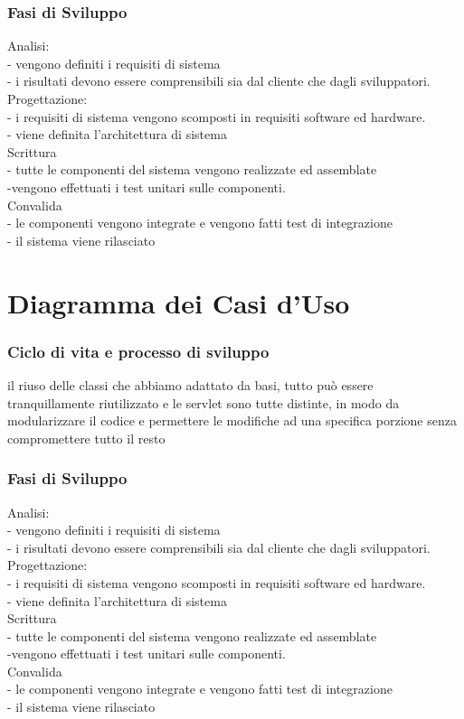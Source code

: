 \documentclass[a4paper,12pt]{beamer}
\begin{document}
\begin{frame}
\frametitle{Fasi di Sviluppo}
Analisi:\\
- vengono definiti i requisiti di sistema\\
- i risultati devono essere comprensibili sia dal cliente che dagli sviluppatori.\\
Progettazione:\\
- i requisiti di sistema vengono scomposti in requisiti software ed hardware.\\
- viene definita l’architettura di sistema\\
Scrittura \\
- tutte le componenti del sistema vengono realizzate ed assemblate  \\
-vengono effettuati i test unitari sulle componenti.\\
Convalida\\
- le componenti vengono integrate e vengono fatti test di integrazione\\
- il sistema viene rilasciato\\
\end{frame}

\pagebreak

\section{Diagramma dei Casi d'Uso}
\begin{frame}
\frametitle{Ciclo di vita e processo di sviluppo}
il riuso delle classi che abbiamo adattato da basi, tutto può essere tranquillamente riutilizzato e le servlet sono tutte distinte, in modo da modularizzare il codice e permettere le modifiche ad una specifica porzione senza compromettere tutto il resto
\end{frame}

\begin{frame}
\frametitle{Fasi di Sviluppo}
Analisi:\\
- vengono definiti i requisiti di sistema\\
- i risultati devono essere comprensibili sia dal cliente che dagli sviluppatori.\\
Progettazione:\\
- i requisiti di sistema vengono scomposti in requisiti software ed hardware.\\
- viene definita l’architettura di sistema\\
Scrittura \\
- tutte le componenti del sistema vengono realizzate ed assemblate  \\
-vengono effettuati i test unitari sulle componenti.\\
Convalida\\
- le componenti vengono integrate e vengono fatti test di integrazione\\
- il sistema viene rilasciato\\
\end{frame}
\end{document}
